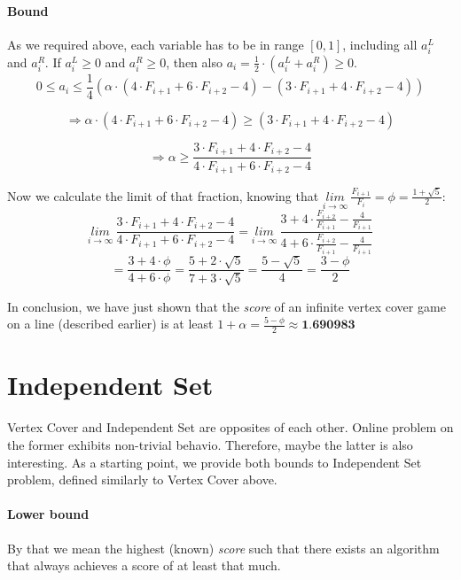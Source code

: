 \documentclass[12pt, A4]{article}
\begin{document}
\paragraph{Bound}
As we required above, each variable has to be in range $[0, 1]$, including all $a_i^L$ and $a_i^R$. If $a_i^L \ge 0$ and $a_i^R \ge 0$, then also $a_i = \frac{1}{2} \cdot (a_i^L + a_i^R) \ge 0$.
\[
0 \le a_i \le \frac{1}{4}\left(\alpha \cdot \left(4 \cdot F_{i+1} + 6 \cdot F_{i+2} - 4\right) - \left(3 \cdot F_{i+1} + 4 \cdot F_{i+2} - 4\right)\right)
\]

\[
\Longrightarrow \alpha \cdot \left(4 \cdot F_{i+1} + 6 \cdot F_{i+2} - 4\right) \ge \left(3 \cdot F_{i+1} + 4 \cdot F_{i+2} - 4\right)
\]

\[
\Longrightarrow \alpha \ge \frac{3 \cdot F_{i+1} + 4 \cdot F_{i+2} - 4}{4 \cdot F_{i+1} + 6 \cdot F_{i+2} - 4}
\]

Now we calculate the limit of that fraction, knowing that $\underset{i \rightarrow \infty}{lim} \ \frac{F_{i+1}}{F_i} = \phi = \frac{1 + \sqrt{5}}{2}$:
\[
\underset{i \rightarrow \infty}{lim} \ \frac{3 \cdot F_{i+1} + 4 \cdot F_{i+2} - 4}{4 \cdot F_{i+1} + 6 \cdot F_{i+2} - 4}
= \underset{i \rightarrow \infty}{lim} \ \frac{3 + 4 \cdot \frac{F_{i+2}}{F_{i+1}} - \frac{4}{F_{i+1}}}{4 + 6 \cdot \frac{F_{i+2}}{F_{i+1}} - \frac{4}{F_{i+1}}}
\]
\[
= \frac{3 + 4 \cdot \phi}{4 + 6 \cdot \phi}
= \frac{5 + 2 \cdot \sqrt{5}}{7 + 3 \cdot \sqrt{5}}
= \frac{5 - \sqrt{5}}{4}
= \frac{3 - \phi}{2}
\]

In conclusion, we have just shown that the \textit{score} of an infinite vertex cover game on a line (described earlier) is at least $1 + \alpha = \frac{5 - \phi}{2} \approx \textbf{1.690983}$



\section{Independent Set}
Vertex Cover and Independent Set are opposites of each other. Online problem on the former exhibits non-trivial behavio. Therefore, maybe the latter is also interesting. As a starting point, we provide both bounds to Independent Set problem, defined similarly to Vertex Cover above.

\paragraph{Lower bound}
By that we mean the highest (known) \textit{score} such that there exists an algorithm that always achieves a score of at least that much.
\end{document}
